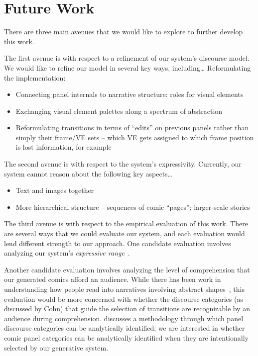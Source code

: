 \section{Future Work}

There are three main avenues that we would like to explore to further develop
this work.

The first avenue is with respect to a refinement of our system's discourse 
model. We would like to refine our model in several key ways, including\ldots
Reformulating the implementation:
\begin{itemize}
\item Connecting panel internals to narrative structure: roles for visual
elements
\item Exchanging visual element palettes along a spectrum of abstraction
\item Reformulating transitions in terms of ``edits'' on previous panels
rather than simply their frame/VE sets -- which VE gets assigned to which
frame position is lost information, for example
\end{itemize}

The second avenue is with respect to the system's expressivity. Currently, our
system cannot reason about the following key aspects\ldots
\begin{itemize}
\item Text and images together
\item More hierarchical structure -- sequences of comic ``pages'';
larger-scale stories
\end{itemize}

The third avenue is with respect to the empirical evaluation of this work.
There are several ways that we could evaluate our system, and each evaluation
would lend different strength to our approach. One candidate evaluation involves
analyzing our system's \emph{expressive range}~\cite{smith2010analyzing}.

Another candidate evaluation involves analyzing the level of comprehension
that our generated comics afford an audience. While there has been work in
understanding how people read into narratives involving abstract
shapes~, this evaluation would be more 
concerned with whether the discourse categories (as discussed by Cohn) that
guide the selection of transitions are recognizable by an audience during
comprehension.  discusses a methodology through 
which panel discourse categories can be analytically identified; we are 
interested in whether comic panel categories can be analytically identified 
when they are intentionally selected by our generative system.







